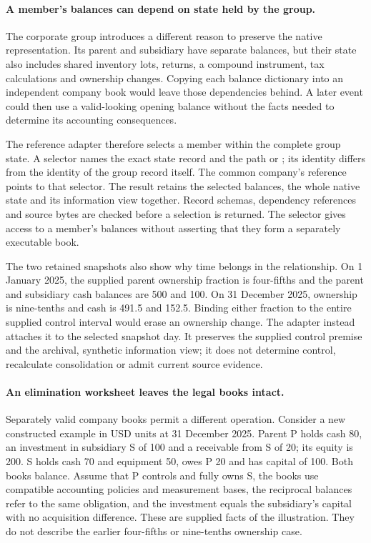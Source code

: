 \paragraph{A member's balances can depend on state held by the group.}
The corporate group introduces a different reason to preserve the native
representation. Its parent and subsidiary have separate balances, but their
state also includes shared inventory lots, returns, a compound instrument,
tax calculations and ownership changes. Copying each balance dictionary into
an independent company book would leave those dependencies behind. A later
event could then use a valid-looking opening balance without the facts needed
to determine its accounting consequences.

The reference adapter therefore selects a member within the complete group
state. A selector names the exact state record and the path
 or ; its identity differs from the identity of
the group record itself. The common company's reference points to that
selector. The result retains the selected balances, the whole native state
and its information view together. Record schemas, dependency references and
source bytes are checked before a selection is returned. The selector gives
access to a member's balances without asserting that they form a separately
executable book.

The two retained snapshots also show why time belongs in the relationship.
On 1 January 2025, the supplied parent ownership fraction is four-fifths and
the parent and subsidiary cash balances are 500 and 100. On 31 December 2025,
ownership is nine-tenths and cash is 491.5 and 152.5. Binding either fraction
to the entire supplied control interval would erase an ownership change.
The adapter instead attaches it to the selected snapshot day. It preserves
the supplied control premise and the archival, synthetic information view;
it does not determine control, recalculate consolidation or admit current
source evidence.

\paragraph{An elimination worksheet leaves the legal books intact.}
Separately valid company books permit a different operation. Consider a new
constructed example in USD units at 31 December 2025. Parent P holds cash 80,
an investment in subsidiary S of 100 and a receivable from S of 20; its equity
is 200. S holds cash 70 and equipment 50, owes P 20 and has capital of 100.
Both books balance. Assume that P controls and fully owns S, the books use
compatible accounting policies and measurement bases, the reciprocal balances
refer to the same obligation, and the investment equals the subsidiary's
capital with no acquisition difference. These are supplied facts of the
illustration. They do not describe the earlier four-fifths or nine-tenths
ownership case.


